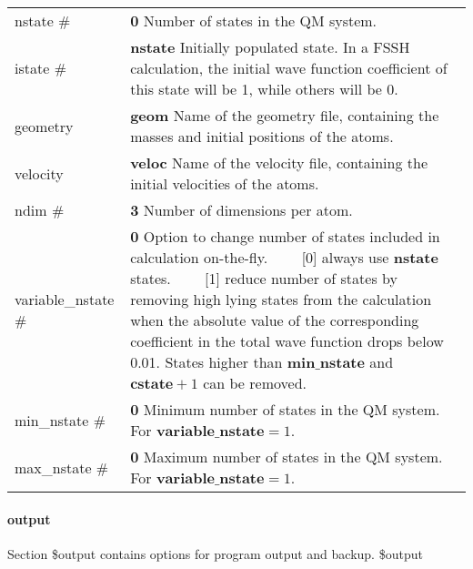\documentclass{report}
\newcommand{\tabitem}{~~\llap{--}~~}
\begin{document}
\begin{tabularx}{\textwidth}{ m{2.5cm} X }
nstate \#		&
    \textbf{0} \newline
    Number of states in the QM system.  \\

istate \#		&
    \textbf{nstate} \newline
    Initially populated state. In a FSSH calculation, the initial wave function coefficient of this state will be 1, while others will be 0.  \\

geometry 		&
    \textbf{geom} \newline
    Name of the geometry file, containing the masses and initial positions of the atoms.  \\

velocity		&
    \textbf{veloc} \newline
    Name of the velocity file, containing the initial velocities of the atoms.  \\

ndim \#		&
    \textbf{3} \newline
    Number of dimensions per atom.  \\	

variable\_nstate \#		&
    \textbf{0} \newline
    Option to change number of states included in calculation on-the-fly. \newline
    \tabitem [0] always use \textbf{nstate} states. \newline
    \tabitem [1] reduce number of states by removing high lying states from the calculation when the absolute value of the corresponding coefficient in the total wave function drops below 0.01. States higher than $\textbf{min\_nstate}$ and $\textbf{cstate}+1$ can be removed. \\

min\_nstate \#		&
    \textbf{0} \newline
    Minimum number of states in the QM system. For $\textbf{variable\_nstate}=1$. \\

max\_nstate \#		&
    \textbf{0} \newline
    Maximum number of states in the QM system. For $\textbf{variable\_nstate}=1$.  \\

\end{tabularx}

\paragraph{output}
Section \$output contains options for program output and backup. \newline
\$output
\end{document}
